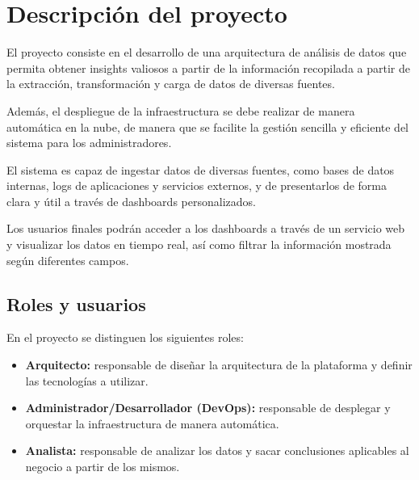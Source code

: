 \section{Descripción del proyecto}\label{sec:descripcion}
%

El proyecto consiste en el desarrollo de una arquitectura de análisis de datos
que permita obtener insights valiosos a partir de la información recopilada a
partir de la extracción, transformación y carga de datos de diversas fuentes.

Además, el despliegue de la infraestructura se debe realizar de manera
automática en la nube, de manera que se facilite la gestión sencilla y eficiente
del sistema para los administradores.

El sistema es capaz de ingestar datos de diversas fuentes, como bases de datos
internas, logs de aplicaciones y servicios externos, y de presentarlos de forma
clara y útil a través de dashboards personalizados.

Los usuarios finales podrán acceder a los dashboards a través de un servicio web
y visualizar los datos en tiempo real, así como filtrar la información mostrada
según diferentes campos.


\subsection{Roles y usuarios}
En el proyecto se distinguen los siguientes roles:

\begin{itemize}
	\item \textbf{Arquitecto:} responsable de diseñar la arquitectura de la
		plataforma y definir las tecnologías a utilizar.
	\item \textbf{Administrador/Desarrollador (DevOps):} responsable de
		desplegar y orquestar la infraestructura de manera automática.
	\item \textbf{Analista:} responsable de analizar los datos y sacar
		conclusiones aplicables al negocio a partir de los mismos.
\end{itemize}


